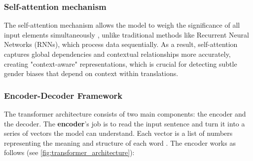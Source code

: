     \subsubsection{Self-attention mechanism}
    The self-attention mechanism allows the model to weigh the significance of all input elements simultaneously \citep{xiaoIntroductionTransformersNLP2023}, unlike traditional methods like Recurrent Neural Networks (RNNs), which process data sequentially. As a result, self-attention captures global dependencies and contextual relationships more accurately, creating "context-aware" representations, which is crucial for detecting subtle gender biases that depend on context within translations.

    \subsubsection{Encoder-Decoder Framework} \label{subsection:encoder-decoder}
    The transformer architecture consists of two main components: the encoder and the decoder. The \textbf{encoder}’s job is to read the input sentence and turn it into a series of vectors the model can understand. Each vector is a list of numbers representing the meaning and structure of each word \citep{xiaoIntroductionTransformersNLP2023}. The encoder works as follows (see \autoref{fig:transformer_architecture}):


